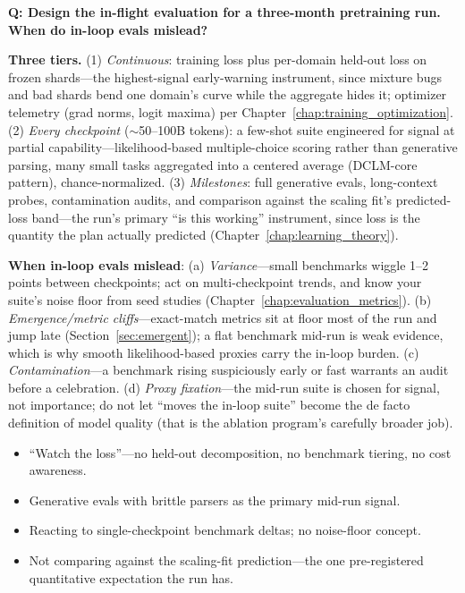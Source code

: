 \begin{interviewq}
\textbf{Q: Design the in-flight evaluation for a three-month pretraining run. When do in-loop evals mislead?}

 \quad {} \quad \badgefreq{\freqmed}

\stronganswer
\textbf{Three tiers.} (1) \textit{Continuous}: training loss plus per-domain held-out loss on frozen shards---the highest-signal early-warning instrument, since mixture bugs and bad shards bend one domain's curve while the aggregate hides it; optimizer telemetry (grad norms, logit maxima) per Chapter~\ref{chap:training_optimization}. (2) \textit{Every checkpoint} ($\sim$50--100B tokens): a few-shot suite engineered for signal at partial capability---likelihood-based multiple-choice scoring rather than generative parsing, many small tasks aggregated into a centered average (DCLM-core pattern), chance-normalized. (3) \textit{Milestones}: full generative evals, long-context probes, contamination audits, and comparison against the scaling fit's predicted-loss band---the run's primary ``is this working'' instrument, since loss is the quantity the plan actually predicted (Chapter~\ref{chap:learning_theory}).

\textbf{When in-loop evals mislead}: (a) \textit{Variance}---small benchmarks wiggle 1--2 points between checkpoints; act on multi-checkpoint trends, and know your suite's noise floor from seed studies (Chapter~\ref{chap:evaluation_metrics}). (b) \textit{Emergence/metric cliffs}---exact-match metrics sit at floor most of the run and jump late (Section~\ref{sec:emergent}); a flat benchmark mid-run is weak evidence, which is why smooth likelihood-based proxies carry the in-loop burden. (c) \textit{Contamination}---a benchmark rising suspiciously early or fast warrants an audit before a celebration. (d) \textit{Proxy fixation}---the mid-run suite is chosen for signal, not importance; do not let ``moves the in-loop suite'' become the de facto definition of model quality (that is the ablation program's carefully broader job).

\redflags
\begin{itemize}
    \item ``Watch the loss''---no held-out decomposition, no benchmark tiering, no cost awareness.
    \item Generative evals with brittle parsers as the primary mid-run signal.
    \item Reacting to single-checkpoint benchmark deltas; no noise-floor concept.
    \item Not comparing against the scaling-fit prediction---the one pre-registered quantitative expectation the run has.
\end{itemize}


\end{interviewq}
